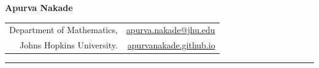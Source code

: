 \documentclass[letterpaper,oneside]{article}
\makeatletter
\def\blfootnote{\xdef\@thefnmark{}\@footnotetext}
\makeatother
\begin{document}
\begin{flushright}
\small
\fbox{\today}
\end{flushright}


\noindent  \LARGE{\textbf{Apurva Nakade}}  \\
\vspace{-0.75ex}
\normalsize

{\vspace{-3em}
\small
	\begin{longtable}[r]{r r}
		Department of Mathematics,
    & \href{mailto:apurva.nakade@jhu.edu}{apurva.nakade@jhu.edu}          \\
		Johns Hopkins University. & \href{https://apurvanakade.github.io}{apurvanakade.github.io}
	\end{longtable}
}
\vspace{-2em}
\noindent\rule{\textwidth}{0.1pt}


\noindent \begin{longtable}[l]{@{} p{2.5cm} p{12.75cm} l}










% 
% 

% 
% 
\end{longtable}

\end{document}
